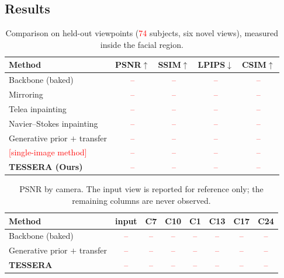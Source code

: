 \documentclass[runningheads]{llncs}
\newcommand{\PH}[1]{\textcolor{red}{#1}}
\begin{document}
\subsection{Results}

\begin{table}[htbp]
  \caption{Comparison on held-out viewpoints (\PH{74} subjects, six novel
           views), measured inside the facial region.}
  \label{tab:main}
  \centering
  \begin{tabular}{@{}lcccc@{}}
    \toprule
    Method & PSNR$\uparrow$ & SSIM$\uparrow$ & LPIPS$\downarrow$ & CSIM$\uparrow$ \\
    \midrule
    Backbone (baked) \cite{feng2021deca} & \PH{--} & \PH{--} & \PH{--} & \PH{--} \\
    Mirroring                            & \PH{--} & \PH{--} & \PH{--} & \PH{--} \\
    Telea inpainting                     & \PH{--} & \PH{--} & \PH{--} & \PH{--} \\
    Navier--Stokes inpainting            & \PH{--} & \PH{--} & \PH{--} & \PH{--} \\
    Generative prior $+$ transfer \cite{li2024uvidm} & \PH{--} & \PH{--} & \PH{--} & \PH{--} \\
    \PH{[single-image method]}           & \PH{--} & \PH{--} & \PH{--} & \PH{--} \\
    \textbf{TESSERA (Ours)}                     & \PH{--} & \PH{--} & \PH{--} & \PH{--} \\
    \bottomrule
  \end{tabular}
\end{table}

\begin{table}[htbp]
  \caption{PSNR by camera. The input view is reported for reference only; the
           remaining columns are never observed.}
  \label{tab:perview}
  \centering
  \begin{tabular}{@{}lccccccc@{}}
    \toprule
    Method & input & C7 & C10 & C1 & C13 & C17 & C24 \\
    \midrule
    Backbone (baked)              & \PH{--} & \PH{--} & \PH{--} & \PH{--} & \PH{--} & \PH{--} & \PH{--} \\
    Generative prior $+$ transfer & \PH{--} & \PH{--} & \PH{--} & \PH{--} & \PH{--} & \PH{--} & \PH{--} \\
    \textbf{TESSERA}              & \PH{--} & \PH{--} & \PH{--} & \PH{--} & \PH{--} & \PH{--} & \PH{--} \\
    \bottomrule
  \end{tabular}
\end{table}
\end{document}
